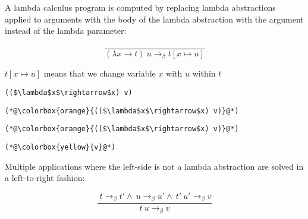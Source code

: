 \documentclass{beamer}
\begin{document}
\begin{frame}[fragile]{\CurrentSection}
\begin{exampleblock}{}
A lambda calculus program is computed by replacing lambda abstractions applied to arguments with the body of the lambda abstraction with the argument instead of the lambda parameter:
\end{exampleblock}

 
\pause 
$$\frac{}{(\lambda x \rightarrow t)\ u  \rightarrow_\beta t [ x \mapsto u ]}$$
 
\begin{exampleblock}{}
$t [ x \mapsto u ]$ means that we change variable $x$ with $u$ within $t$
\end{exampleblock}

 

\end{frame}

\begin{frame}[fragile]{\CurrentSection}
\lstset{basicstyle=\ttfamily\small}\lstset{numbers=none}\lstset{language=ML}\begin{lstlisting}
(($\lambda$x$\rightarrow$x) v)
\end{lstlisting}
\pause\lstset{language=ML}\begin{lstlisting}
(*@\colorbox{orange}{(($\lambda$x$\rightarrow$x) v)}@*)
\end{lstlisting}

\end{frame}

\begin{frame}[fragile]{\CurrentSection}
\lstset{basicstyle=\ttfamily\small}\lstset{numbers=none}\lstset{language=ML}\begin{lstlisting}
(*@\colorbox{orange}{(($\lambda$x$\rightarrow$x) v)}@*)
\end{lstlisting}
\pause\lstset{language=ML}\begin{lstlisting}
(*@\colorbox{yellow}{v}@*)
\end{lstlisting}

\end{frame}

\begin{frame}[fragile]{\CurrentSection}
\begin{exampleblock}{}
Multiple applications where the left-side is not a lambda abstraction are solved in a left-to-right fashion:
\end{exampleblock}

 
\pause 
$$\frac{\ t \rightarrow_\beta t'\wedge\ u \rightarrow_\beta u'\wedge\ t'\ u' \rightarrow_\beta v}{t\ u \rightarrow_\beta v}$$
 

\end{frame}
\end{document}

